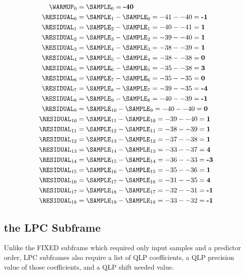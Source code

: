 \begin{align*}
\WARMUP_0 &= \SAMPLE_0 = \textbf{-40} \\
\RESIDUAL_0 &= \SAMPLE_1 - \SAMPLE_0 = -41 - -40 = \textbf{-1} \\
\RESIDUAL_1 &= \SAMPLE_2 - \SAMPLE_1 = -40 - -41 = \textbf{1} \\
\RESIDUAL_2 &= \SAMPLE_3 - \SAMPLE_2 = -39 - -40 = \textbf{1} \\
\RESIDUAL_3 &= \SAMPLE_4 - \SAMPLE_3 = -38 - -39 = \textbf{1} \\
\RESIDUAL_4 &= \SAMPLE_5 - \SAMPLE_4 = -38 - -38 = \textbf{0} \\
\RESIDUAL_5 &= \SAMPLE_6 - \SAMPLE_5 = -35 - -38 = \textbf{3} \\
\RESIDUAL_6 &= \SAMPLE_7 - \SAMPLE_6 = -35 - -35 = \textbf{0} \\
\RESIDUAL_7 &= \SAMPLE_8 - \SAMPLE_7 = -39 - -35 = \textbf{-4} \\
\RESIDUAL_8 &= \SAMPLE_9 - \SAMPLE_8 = -40 - -39 = \textbf{-1} \\
\RESIDUAL_9 &= \SAMPLE_{10} - \SAMPLE_9 = -40 - -40 = \textbf{0} \\
\RESIDUAL_{10} &= \SAMPLE_{11} - \SAMPLE_{10} = -39 - -40 = \textbf{1} \\
\RESIDUAL_{11} &= \SAMPLE_{12} - \SAMPLE_{11} = -38 - -39 = \textbf{1} \\
\RESIDUAL_{12} &= \SAMPLE_{13} - \SAMPLE_{12} = -37 - -38 = \textbf{1} \\
\RESIDUAL_{13} &= \SAMPLE_{14} - \SAMPLE_{13} = -33 - -37 = \textbf{4} \\
\RESIDUAL_{14} &= \SAMPLE_{15} - \SAMPLE_{14} = -36 - -33 = \textbf{-3} \\
\RESIDUAL_{15} &= \SAMPLE_{16} - \SAMPLE_{15} = -35 - -36 = \textbf{1} \\
\RESIDUAL_{16} &= \SAMPLE_{17} - \SAMPLE_{16} = -31 - -35 = \textbf{4} \\
\RESIDUAL_{17} &= \SAMPLE_{18} - \SAMPLE_{17} = -32 - -31 = \textbf{-1} \\
\RESIDUAL_{18} &= \SAMPLE_{19} - \SAMPLE_{18} = -33 - -32 = \textbf{-1} \\
\end{align*}

\clearpage

\subsection{the LPC Subframe}
\label{flac_lpc_encoding}
Unlike the FIXED subframe which required only input samples and a
predictor order, LPC subframes also require a list of QLP coefficients,
a QLP precision value of those coefficients, and a QLP shift needed
value.

